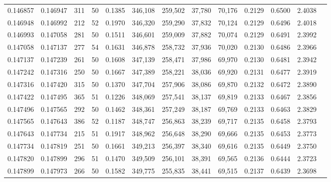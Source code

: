 \begin{tabular}{rrrrrrrrrrrrr}
0.146857 & 0.146947 &   311 &  50 &                                     0.1385 & 346,108 & 259,502 &  37,780 &  70,176 & 0.2129 & 0.6500 & 2.4038 \\
0.146948 & 0.146992 &   212 &  52 &                                     0.1970 & 346,320 & 259,290 &  37,832 &  70,124 & 0.2129 & 0.6496 & 2.4018 \\
0.146993 & 0.147058 &   281 &  50 &                                     0.1511 & 346,601 & 259,009 &  37,882 &  70,074 & 0.2129 & 0.6491 & 2.3992 \\
0.147058 & 0.147137 &   277 &  54 &                                     0.1631 & 346,878 & 258,732 &  37,936 &  70,020 & 0.2130 & 0.6486 & 2.3966 \\
0.147137 & 0.147239 &   261 &  50 &                                     0.1608 & 347,139 & 258,471 &  37,986 &  69,970 & 0.2130 & 0.6481 & 2.3942 \\
0.147242 & 0.147316 &   250 &  50 &                                     0.1667 & 347,389 & 258,221 &  38,036 &  69,920 & 0.2131 & 0.6477 & 2.3919 \\
0.147316 & 0.147420 &   315 &  50 &                                     0.1370 & 347,704 & 257,906 &  38,086 &  69,870 & 0.2132 & 0.6472 & 2.3890 \\
0.147422 & 0.147495 &   365 &  51 &                                     0.1226 & 348,069 & 257,541 &  38,137 &  69,819 & 0.2133 & 0.6467 & 2.3856 \\
0.147496 & 0.147565 &   292 &  50 &                                     0.1462 & 348,361 & 257,249 &  38,187 &  69,769 & 0.2133 & 0.6463 & 2.3829 \\
0.147565 & 0.147643 &   386 &  52 &                                     0.1187 & 348,747 & 256,863 &  38,239 &  69,717 & 0.2135 & 0.6458 & 2.3793 \\
0.147643 & 0.147734 &   215 &  51 &                                     0.1917 & 348,962 & 256,648 &  38,290 &  69,666 & 0.2135 & 0.6453 & 2.3773 \\
0.147734 & 0.147819 &   251 &  50 &                                     0.1661 & 349,213 & 256,397 &  38,340 &  69,616 & 0.2135 & 0.6449 & 2.3750 \\
0.147820 & 0.147899 &   296 &  51 &                                     0.1470 & 349,509 & 256,101 &  38,391 &  69,565 & 0.2136 & 0.6444 & 2.3723 \\
0.147899 & 0.147973 &   266 &  50 &                                     0.1582 & 349,775 & 255,835 &  38,441 &  69,515 & 0.2137 & 0.6439 & 2.3698 \\

\end{tabular}
